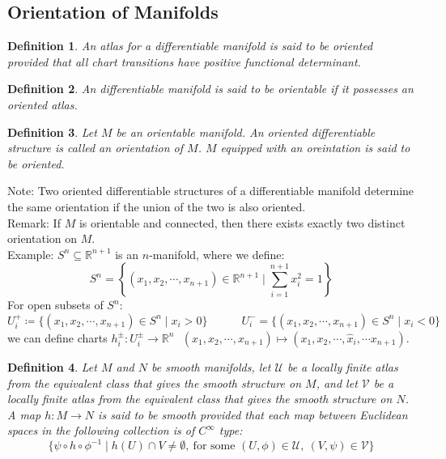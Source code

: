\documentclass[11pt]{book}
\theoremstyle{break}
\theoremstyle{break}
\newtheorem{defn}{Definition}[corL]
\newcommand{\R}{\mathbb{R}}
\newcommand{\note}{\color{red}Note: \color{black}}
\newcommand{\remark}{\color{blue}Remark: \color{black}}
\newcommand{\example}{\color{green}Example: \color{black}}
\begin{document}
\subsection{Orientation of Manifolds}
\begin{defn}
An atlas for a differentiable manifold is said to be oriented provided that all chart transitions have positive functional determinant.
\end{defn}

\begin{defn}
An differentiable manifold is said to be orientable if it possesses an oriented atlas.
\end{defn}

\begin{defn}
Let $M$ be an orientable manifold. An oriented differentiable structure is called an orientation of $M$. $M$ equipped with an oreintation is said to be oriented. 
\end{defn}

\note Two oriented differentiable structures of a differentiable manifold determine the same orientation if the union of the two is also oriented. \\

\remark If $M$ is orientable and connected, then there exists exactly two distinct orientation on $M$.\\

\example $S^n \subseteq \R^{n+1}$ is an $n$-manifold, where we define:
$$S^n= \left\{(x_1,x_2,\cdots, x_{n+1}) \in \R^{n+1} \mid \sum_{i=1}^{n+1} x_i^2 = 1\right\}$$ 
For open subsets of $S^n$:
$$U_i^+ \coloneqq \{ (x_1,x_2,\cdots, x_{n+1})\in S^n \mid x_i >0\}\qquad\quad U_i^- = \{ (x_1,x_2,\cdots, x_{n+1}) \in S^n \mid x_i < 0 \}$$ 
we can define charts $h_i^{\pm}: U^{\pm}_i \to \R^n \ \ \ (x_1,x_2,\cdots, x_{n+1}) \mapsto (x_1,x_2,\cdots, \hat{x}_i , \cdots x_{n+1})$. \\

\begin{defn}
Let $M$ and $N$ be smooth manifolds, let $\mathcal{U}$ be a locally finite atlas from the equivalent class that gives the smooth structure on $M$, and let $\mathcal{V}$ be a locally finite atlas from the equivalent class that gives the smooth structure on $N$. A map $h:M \to N$ is said to be smooth provided that each map between Euclidean spaces in the following collection is of $C^\infty$ type:
$$\{\psi \circ h \circ \phi^{-1} \mid h(U)\cap V \neq \emptyset, \ \text{for some }(U,\phi) \in \mathcal{U},\ (V,\psi)\in \mathcal{V}\}$$
\end{defn}
\end{document}
